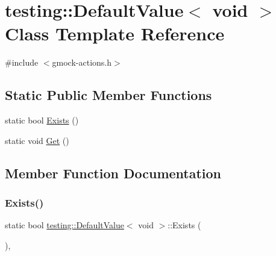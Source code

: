 \hypertarget{classtesting_1_1DefaultValue_3_01void_01_4}{}\section{testing\+::Default\+Value$<$ void $>$ Class Template Reference}
\label{classtesting_1_1DefaultValue_3_01void_01_4}


{\ttfamily \#include $<$gmock-\/actions.\+h$>$}

\subsection*{Static Public Member Functions}
\begin{DoxyCompactItemize}
\item 
static bool \mbox{\hyperlink{classtesting_1_1DefaultValue_3_01void_01_4_ae18ea46cbf928b820c91f15fa7aa317b}{Exists}} ()
\item 
static void \mbox{\hyperlink{classtesting_1_1DefaultValue_3_01void_01_4_acda4c367a5b0c0cfb28bc2289f385eed}{Get}} ()
\end{DoxyCompactItemize}


\subsection{Member Function Documentation}
\mbox{\label{classtesting_1_1DefaultValue_3_01void_01_4_ae18ea46cbf928b820c91f15fa7aa317b}} 
\subsubsection{\texorpdfstring{Exists()}{Exists()}}
{\footnotesize\ttfamily static bool \mbox{\hyperlink{classtesting_1_1DefaultValue}{testing\+::\+Default\+Value}}$<$ void $>$\+::Exists (\begin{DoxyParamCaption}{ }\end{DoxyParamCaption})\hspace{0.3cm}{\ttfamily [inline]}, {\ttfamily [static]}}

\mbox{\label{classtesting_1_1DefaultValue_3_01void_01_4_acda4c367a5b0c0cfb28bc2289f385eed}} 
